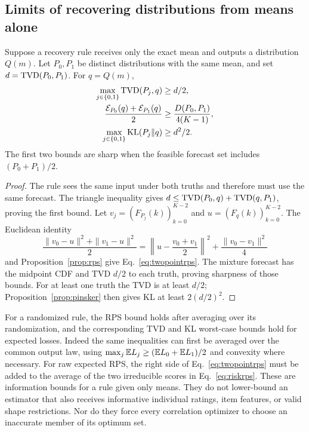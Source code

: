 \subsection{Limits of recovering distributions from means alone}
\begin{proposition}\label{prop:lower}
Suppose a recovery rule receives only the exact mean and outputs a distribution $Q(m)$.
Let $P_0,P_1$ be distinct distributions with the same mean, and set $d=\operatorname{TVD}(P_0,P_1)$.
For $q=Q(m)$,
\begin{align}
 \max_{j\in\{0,1\}}\operatorname{TVD}(P_j,q)&\ge d/2,\\
 \frac{\mathcal E_{P_0}(q)+\mathcal E_{P_1}(q)}2
 &\ge\frac{D(P_0,P_1)}{4(K-1)},\label{eq:twopointrps}\\
 \max_{j\in\{0,1\}}\operatorname{KL}(P_j\Vert q)&\ge d^2/2.
\end{align}
The first two bounds are sharp when the feasible forecast set includes $(P_0+P_1)/2$.
\end{proposition}
\begin{proof}
The rule sees the same input under both truths and therefore must use the same forecast.
The triangle inequality gives $d\le\operatorname{TVD}(P_0,q)+\operatorname{TVD}(q,P_1)$, proving the first bound.
Let $v_j=(F_{P_j}(k))_{k=0}^{K-2}$ and $u=(F_q(k))_{k=0}^{K-2}$.
The Euclidean identity
\[
 \frac{\|v_0-u\|^2+\|v_1-u\|^2}{2}
 =\left\|u-\frac{v_0+v_1}{2}\right\|^2+\frac{\|v_0-v_1\|^2}{4}
\]
and Proposition~\ref{prop:rps} give Eq.~\eqref{eq:twopointrps}.
The mixture forecast has the midpoint CDF and TVD $d/2$ to each truth, proving sharpness of those bounds.
For at least one truth the TVD is at least $d/2$; Proposition~\ref{prop:pinsker} then gives KL at least $2(d/2)^2$.
\end{proof}

For a randomized rule, the RPS bound holds after averaging over its randomization, and the corresponding TVD and KL worst-case bounds hold for expected losses.
Indeed the same inequalities can first be averaged over the common output law, using $\max_j\mathbb{E} L_j\ge(\mathbb{E} L_0+\mathbb{E} L_1)/2$ and convexity where necessary.
For raw expected RPS, the right side of Eq.~\eqref{eq:twopointrps} must be added to the average of the two irreducible scores in Eq.~\eqref{eq:riskrps}.
These are information bounds for a rule given only means.
They do not lower-bound an estimator that also receives informative individual ratings, item features, or valid shape restrictions.
Nor do they force every correlation optimizer to choose an inaccurate member of its optimum set.
